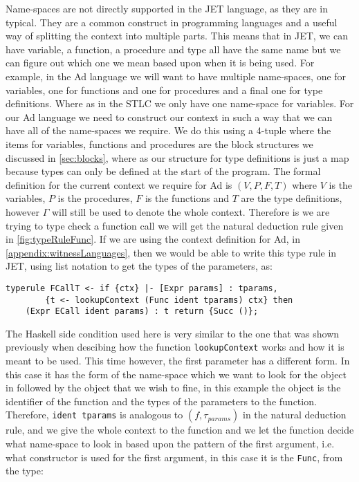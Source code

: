 Name-spaces are not directly supported in the JET language, as they are in typical\cite{grimm2007typical}.
They are a common construct in programming languages and a useful way of splitting the context into multiple parts.
This means that in JET, we can have variable, a function, a procedure and type all have the same name but we can figure out which one we mean based upon when it is being used.
For example, in the Ad language we will want to have multiple name-spaces, one for variables, one for functions and one for procedures and a final one for type definitions.
Where as in the STLC we only have one name-space for variables.
For our Ad language we need to construct our context in such a way that we can have all of the name-spaces we require.
We do this using a 4-tuple where the items for variables, functions and procedures are the block structures we discussed in \autoref{sec:blocks}, where as our structure for type definitions is just a map because types can only be defined at the start of the program.
The formal definition for the current context we require for Ad is $(V, P, F, T)$ where $V$ is the variables, $P$ is the procedures, $F$ is the functions and $T$ are the type definitions, however $\Gamma$ will still be used to denote the whole context.
Therefore is we are trying to type check a function call we will get the natural deduction rule given in \autoref{fig:typeRuleFunc}.
If we are using the context definition for Ad, in \autoref{appendix:witnessLanguages}, then we would be able to write this type rule in JET, using list notation to get the types of the parameters, as:
\begin{lstlisting}
typerule FCallT <- if {ctx} |- [Expr params] : tparams, 
        {t <- lookupContext (Func ident tparams) ctx} then 
    (Expr ECall ident params) : t return {Succ ()};
\end{lstlisting}
The Haskell side condition used here is very similar to the one that was shown previously when descibing how the function \texttt{lookupContext} works and how it is meant to be used.
This time however, the first parameter has a different form.
In this case it has the form of the name-space which we want to look for the object in followed by the object that we wish to fine, in this example the object is the identifier of the function and the types of the parameters to the function.
Therefore, \texttt{ident tparams} is analogous to $(f, \tau_{params})$ in the natural deduction rule, and we give the whole context to the function and we let the function decide what name-space to look in based upon the pattern of the first argument, i.e. what constructor is used for the first argument, in this case it is the \texttt{Func}, from the type:
